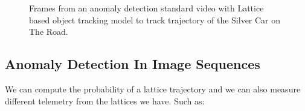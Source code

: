 \documentclass{article}
\begin{document}
\begin{figure}[ht]
    \centering
    \qquad
    \qquad
    \qquad
    \qquad
    \qquad
    \qquad
    \qquad
    \caption{ Frames from an anomaly detection standard video \cite{idiap} with Lattice based object tracking model to track trajectory of the Silver Car on The Road. \label{fig:object-tracking-video-frame-1-6-lattice}}
\end{figure}

\clearpage
\subsection{Anomaly Detection In Image Sequences}
We can compute the probability of a lattice trajectory and we can also measure different telemetry from the lattices we have. Such as:
\end{document}
